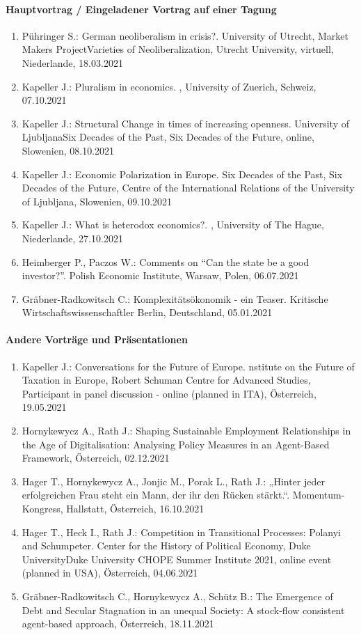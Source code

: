 \paragraph{Hauptvortrag / Eingeladener Vortrag auf einer Tagung}
\begin{enumerate}
	\item Pühringer S.: German neoliberalism in crisis?. University of Utrecht, Market Makers ProjectVarieties of Neoliberalization, Utrecht University, virtuell, Niederlande, 18.03.2021
	\item Kapeller J.: Pluralism in economics. , University of Zuerich, Schweiz, 07.10.2021
	\item Kapeller J.: Structural Change in times of increasing openness. University of LjubljanaSix Decades of the Past, Six Decades of the Future, online, Slowenien, 08.10.2021
	\item Kapeller J.: Economic Polarization in Europe. Six Decades of the Past, Six Decades of the Future, Centre of the International Relations of the University of Ljubljana, Slowenien, 09.10.2021
	\item Kapeller J.: What is heterodox economics?. , University of The Hague, Niederlande, 27.10.2021
	\item Heimberger P., Paczos W.: Comments on “Can the state be a good investor?”. Polish Economic Institute, Warsaw, Polen, 06.07.2021
	\item Gräbner-Radkowitsch C.: Komplexitätsökonomik - ein Teaser. Kritische Wirtschaftswissenschaftler Berlin, Deutschland, 05.01.2021
\end{enumerate}
\paragraph{Andere Vorträge und Präsentationen}
\begin{enumerate}
	\item Kapeller J.: Conversations for the Future of Europe. nstitute on the Future of Taxation in Europe, Robert Schuman Centre for Advanced Studies, Participant in panel discussion - online (planned in ITA), Österreich, 19.05.2021
	\item Hornykewycz A., Rath J.: Shaping Sustainable Employment Relationships in the Age of Digitalisation: Analysing Policy Measures in an Agent-Based Framework, Österreich, 02.12.2021
	\item Hager T., Hornykewycz A., Jonjic M., Porak L., Rath J.: „Hinter jeder erfolgreichen Frau steht ein Mann, der ihr den Rücken stärkt.“. Momentum-Kongress, Hallstatt, Österreich, 16.10.2021
	\item Hager T., Heck I., Rath J.: Competition in Transitional Processes: Polanyi and Schumpeter. Center for the History of Political Economy, Duke UniversityDuke University CHOPE Summer Institute 2021, online event (planned in USA), Österreich, 04.06.2021
	\item Gräbner-Radkowitsch C., Hornykewycz A., Schütz B.: The Emergence of Debt and Secular Stagnation in an unequal Society: A stock-flow consistent agent-based approach, Österreich, 18.11.2021
\end{enumerate}
